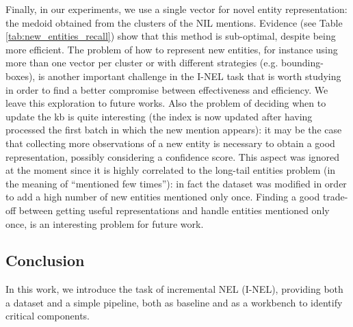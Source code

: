 
Finally, in our experiments, we use a single vector for novel entity representation: the medoid obtained from the clusters of the NIL mentions. Evidence (see Table \ref{tab:new_entities_recall}) show that this method is sub-optimal, despite being more efficient.
The problem of how to represent new entities, for instance using more than one vector per cluster or with different strategies (e.g. bounding-boxes), is another important challenge in the I-NEL task that is worth studying in order to find a better compromise between effectiveness and efficiency. We leave this exploration to future works.
Also the problem of deciding when to update the \ac{kb} is quite interesting (the index is now updated after having processed the first batch in which the new mention appears): it may be the case that collecting more observations of a new entity is necessary to obtain a good representation, possibly considering a confidence score.
This aspect was ignored at the moment since it is highly correlated to the long-tail entities problem (in the meaning of ``mentioned few times''): in fact the dataset was modified in order to add a high number of new entities mentioned only once.
Finding a good trade-off between getting useful representations and handle entities mentioned only once, is an interesting problem for future work.



\subsection{Conclusion}
In this work, we introduce the task of incremental NEL (I-NEL), providing both a dataset and a simple pipeline, both as baseline and as a workbench to identify critical components.

